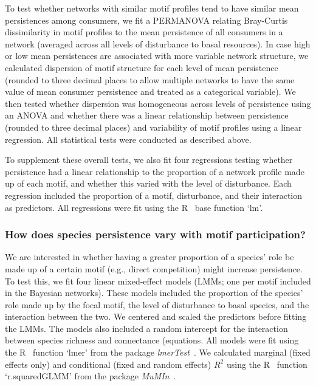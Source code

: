 \documentclass[12pt]{article}
\begin{document}
\begin{spacing}{2.0}
            To test whether networks with similar motif profiles tend to have similar mean persistences among consumers, we fit a PERMANOVA relating Bray-Curtis dissimilarity in motif profiles to the mean persistence of all consumers in a network (averaged across all levels of disturbance to basal resources).
            In case high or low mean persistences are associated with more variable network structure, we calculated dispersion of motif structure for each level of mean persistence (rounded to three decimal places to allow multiple networks to have the same value of mean consumer persistence and treated as a categorical variable). 
            We then tested whether dispersion was homogeneous across levels of persistence using an ANOVA and whether there was a linear relationship between persistence (rounded to three decimal places) and variability of motif profiles using a linear regression.
            All statistical tests were conducted as described above.
            
            
            To supplement these overall tests, we also fit four regressions testing whether persistence had a linear relationship to the proportion of a network profile made up of each motif, and whether this varied with the level of disturbance.
            Each regression included the proportion of a motif, disturbance, and their interaction as predictors.
            All regressions were fit using the R~\citep{R} base function `lm'.
        
        
        \subsubsection*{How does species persistence vary with motif participation?}

            We are interested in whether having a greater proportion of a species' role be made up of a certain motif (e.g., direct competition) might increase persistence.
            To test this, we fit four linear mixed-effect models (LMMs; one per motif included in the Bayesian networks).
            These models included the proportion of the species' role made up by the focal motif, the level of disturbance to basal species, and the interaction between the two.
            We centered and scaled the predictors before fitting the LMMs.
            The models also included a random intercept for the interaction between species richness and connectance (equations.
            All models were fit using the R~\citep{R} function `lmer' from the package \emph{lmerTest}~\citep{lmerTest}.
            We calculated marginal (fixed effects only) and conditional (fixed and random effects) $R^2$ using the R~\citep{R} function `r.squaredGLMM' from the package \emph{MuMIn}~\citep{MuMIn}.


\end{spacing}
\end{document}
